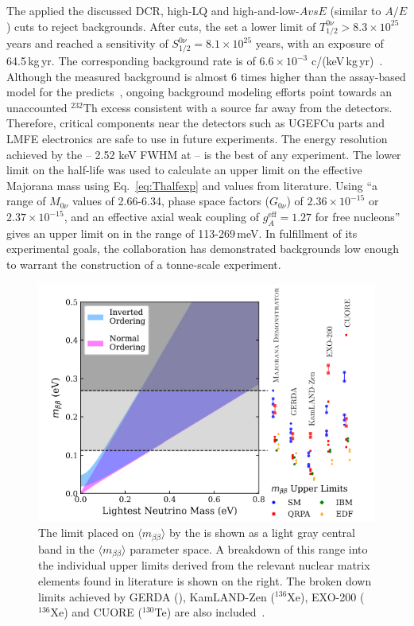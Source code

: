 The {\MJDEMit} applied the discussed DCR, high-LQ and high-and-low-$AvsE$ (similar to $A/E$) cuts to reject backgrounds. After cuts, the {\DEMit} set a lower limit of $T^{0\nu}_{1/2} > 8.3\times10^{25}$ years and reached a sensitivity of $S^{0\nu}_{1/2} = 8.1\times10^{25}$ years, with an exposure of 64.5\,kg\,yr. The corresponding background rate is of $6.6\times10^{-3}$ c/(keV\,kg\,yr)~\cite{mjd_final}. Although the measured background is almost 6 times higher than the assay-based model for the {\DEMit} predicts~\cite{assaypaper}, ongoing background modeling efforts point towards an unaccounted $^{232}$Th excess consistent with a source far away from the detectors. Therefore, critical components near the detectors such as UGEFCu parts and LMFE electronics are safe to use in future experiments. The energy resolution achieved by the {\DEMit} -- 2.52 keV FWHM at \Qbb{} -- is the best of any \novbb{} experiment. The lower limit on the half-life was used to calculate an upper limit on the effective Majorana mass using Eq.~\ref{eq:Thalfexp} and values from literature. Using ``a range of $M_{0\nu}$ values of 2.66-6.34, phase space factors ($G_{0\nu}$) of $2.36\times10^{-15}$ or $2.37\times10^{-15}$, and an effective axial weak coupling of $g^\text{eff}_A=1.27$ for free nucleons''~\cite{mjd_final} gives an upper limit on \mbb{} in the range of 113-269\,meV. In fulfillment of its experimental goals, the {\MJMit} collaboration has demonstrated backgrounds low enough to warrant the construction of a tonne-scale experiment. 
\begin{figure}[tbh]
    \centering
    \includegraphics[width=5in]{figs/0vbb/gerda_mjd_limits.pdf}
    \caption{The limit placed on $\langle m_{\beta\beta} \rangle$ by the {\MJDEMit} is shown as a light gray central band in the $\langle m_{\beta\beta} \rangle$ parameter space. A breakdown of this range into the individual upper limits derived from the relevant nuclear matrix elements found in literature is shown on the right. The broken down limits achieved by GERDA (\geEn{}), KamLAND-Zen ($^{136}$Xe), EXO-200 ($^{136}$Xe) and CUORE ($^{130}$Te) are also included~\cite{mjd_final}.}
    \label{fig:gerda_mjd_limits}
\end{figure}

